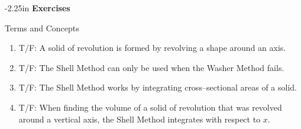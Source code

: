\begin{adjustwidth*}{}{-2.25in}
\textbf{{\large Exercises}}
\setlength{\columnsep}{25pt}
\begin{multicols*}{2}
\noindent Terms and Concepts \small
\begin{enumerate}[1)]
\item T/F: A solid of revolution is formed by revolving a shape around an axis.
\item T/F: The Shell Method can only be used when the Washer Method fails.
\item T/F: The Shell Method works by integrating cross--sectional areas of a solid.
\item T/F: When finding the volume of a solid of revolution that was revolved around a vertical axis, the Shell Method integrates
with respect to $x$.
\end{enumerate} 

 \small



\end{multicols*}
\end{adjustwidth*}
